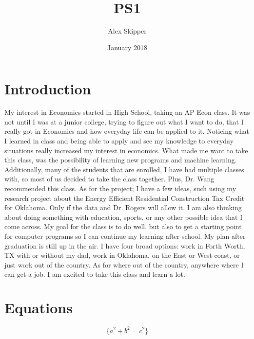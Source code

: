 \documentclass{article}
\title{PS1}
\author{Alex Skipper }
\date{January 2018}
\begin{document}
\maketitle

\section{Introduction}
My interest in Economics started in High School, taking an AP Econ class. It was not until I was at a junior college, trying to figure out what I want to do, that I really got in Economics and how everyday life can be applied to it. Noticing what I learned in class and being able to apply and see my knowledge to everyday situations really increased my interest in economics. What made me want to take this class, was the possibility of learning new programs and machine learning. Additionally, many of the students that are enrolled, I have had multiple classes with, so most of us decided to take the class together. Plus, Dr. Wang recommended this class. As for the project; I have a few ideas, such using my research project about the Energy Efficient Residential Construction Tax Credit for Oklahoma. Only if the data and Dr. Rogers will allow it.  I am also thinking about doing something with education, sports, or any other possible idea that I come across. My goal for the class is to do well, but also to get a starting point for  computer programs so I can continue my learning after school. My plan after graduation is still up in the air. I have four broad options: work in Forth Worth, TX with or without my dad, work in Oklahoma, on the East or West coast, or just work out of the country. As for where out of the country, anywhere where I can get a job. I am excited to take this class and learn a lot.



\section{Equations}
\centering
$$\{a^2+b^2=c^2\}$$
\end{document}
